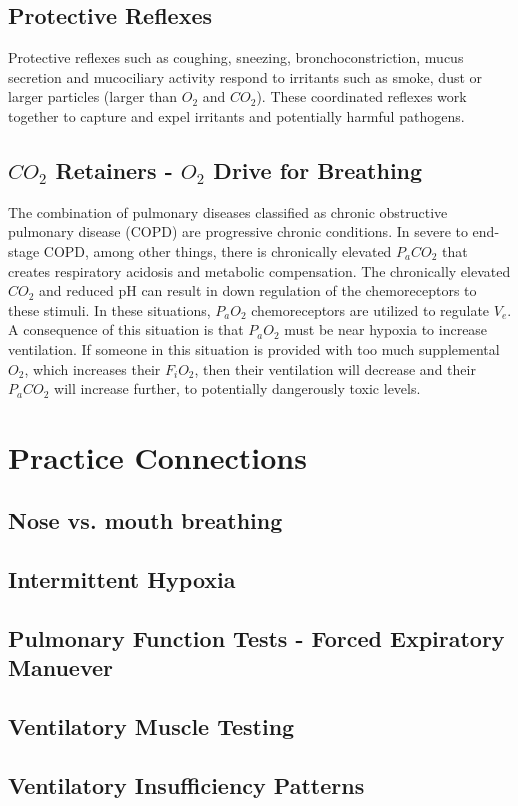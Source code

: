 \subsection{Protective Reflexes}

Protective reflexes such as coughing, sneezing, bronchoconstriction, mucus secretion and mucociliary activity respond to irritants such as smoke, dust or larger particles (larger than $O_2$ and $CO_2$). These coordinated reflexes work together to capture and expel irritants and potentially harmful pathogens.

\subsection{$CO_2$ Retainers - $O_2$ Drive for Breathing}

The combination of pulmonary diseases classified as chronic obstructive pulmonary disease (COPD) are progressive chronic conditions. In severe to end-stage COPD, among other things, there is chronically elevated $P_aCO_2$ that creates respiratory acidosis and metabolic compensation. The chronically elevated $CO_2$ and reduced pH can result in down regulation of the chemoreceptors to these stimuli. In these situations, $P_aO_2$ chemoreceptors are utilized to regulate $V_e$. A consequence of this situation is that $P_aO_2$ must be near hypoxia to increase ventilation. If someone in this situation is provided with too much supplemental $O_2$, which increases their $F_iO_2$, then their ventilation will decrease and their $P_aCO_2$ will increase further, to potentially dangerously toxic levels.

\section{Practice Connections}

\subsection{Nose vs. mouth breathing}

\subsection{Intermittent Hypoxia}

\subsection{Pulmonary Function Tests - Forced Expiratory Manuever}

\subsection{Ventilatory Muscle Testing}

\subsection{Ventilatory Insufficiency Patterns}

\printbibliography[heading=subbibintoc]